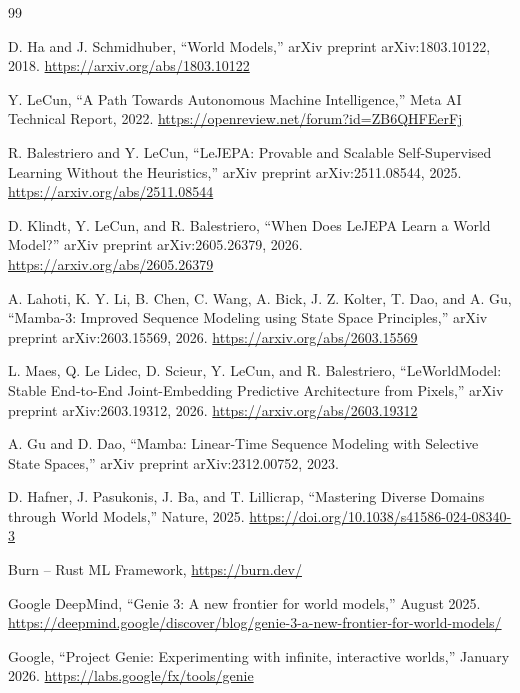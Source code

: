 \documentclass[11pt,a4paper]{ltjsarticle}
\begin{document}
\newpage

\begin{thebibliography}{99}

D. Ha and J. Schmidhuber,
``World Models,''
arXiv preprint arXiv:1803.10122, 2018.
\url{https://arxiv.org/abs/1803.10122}

Y. LeCun,
``A Path Towards Autonomous Machine Intelligence,''
Meta AI Technical Report, 2022.
\url{https://openreview.net/forum?id=ZB6QHFEerFj}

R. Balestriero and Y. LeCun,
``LeJEPA: Provable and Scalable Self-Supervised Learning Without the Heuristics,''
arXiv preprint arXiv:2511.08544, 2025.
\url{https://arxiv.org/abs/2511.08544}

D. Klindt, Y. LeCun, and R. Balestriero,
``When Does LeJEPA Learn a World Model?''
arXiv preprint arXiv:2605.26379, 2026.
\url{https://arxiv.org/abs/2605.26379}

A. Lahoti, K. Y. Li, B. Chen, C. Wang, A. Bick, J. Z. Kolter, T. Dao, and A. Gu,
``Mamba-3: Improved Sequence Modeling using State Space Principles,''
arXiv preprint arXiv:2603.15569, 2026.
\url{https://arxiv.org/abs/2603.15569}

L. Maes, Q. Le Lidec, D. Scieur, Y. LeCun, and R. Balestriero,
``LeWorldModel: Stable End-to-End Joint-Embedding Predictive Architecture from Pixels,''
arXiv preprint arXiv:2603.19312, 2026.
\url{https://arxiv.org/abs/2603.19312}

A. Gu and D. Dao,
``Mamba: Linear-Time Sequence Modeling with Selective State Spaces,''
arXiv preprint arXiv:2312.00752, 2023.

D. Hafner, J. Pasukonis, J. Ba, and T. Lillicrap,
``Mastering Diverse Domains through World Models,''
Nature, 2025.
\url{https://doi.org/10.1038/s41586-024-08340-3}

Burn -- Rust ML Framework,
\url{https://burn.dev/}

Google DeepMind,
``Genie 3: A new frontier for world models,''
August 2025.
\url{https://deepmind.google/discover/blog/genie-3-a-new-frontier-for-world-models/}

Google,
``Project Genie: Experimenting with infinite, interactive worlds,''
January 2026.
\url{https://labs.google/fx/tools/genie}


\end{thebibliography}
\end{document}
